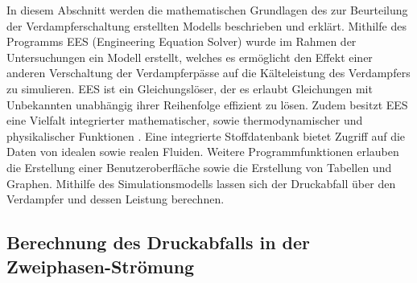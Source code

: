 In diesem Abschnitt werden die mathematischen Grundlagen des zur Beurteilung der Verdampferschaltung erstellten Modells beschrieben und erklärt.
Mithilfe des Programms EES (Engineering Equation Solver) wurde im Rahmen der Untersuchungen ein Modell erstellt, welches es ermöglicht den Effekt einer anderen Verschaltung der Verdampferpässe auf die Kälteleistung des Verdampfers zu simulieren.  
EES ist ein Gleichungslöser, der es erlaubt Gleichungen mit Unbekannten unabhängig ihrer Reihenfolge effizient zu lösen. Zudem besitzt EES eine Vielfalt integrierter mathematischer, sowie thermodynamischer und physikalischer Funktionen \cite{Klein.2000}. Eine integrierte Stoffdatenbank bietet Zugriff auf die Daten von idealen sowie realen Fluiden. Weitere Programmfunktionen erlauben die Erstellung einer Benutzeroberfläche sowie die Erstellung von Tabellen und Graphen. \newline
Mithilfe des Simulationsmodells lassen sich der Druckabfall über den Verdampfer und dessen Leistung berechnen. 



%



\subsection{Berechnung des Druckabfalls in der Zweiphasen-Strömung}
\label{subsec:Berechnung des Druckabfalls in der Zweiphasen-Strömung}

